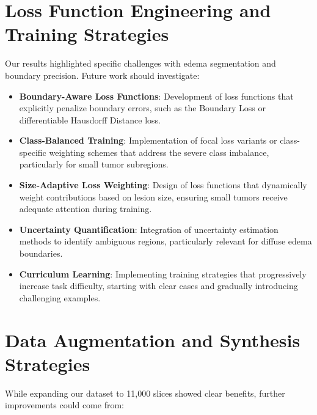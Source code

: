 \section{Loss Function Engineering and Training Strategies}

Our results highlighted specific challenges with edema segmentation and boundary precision. Future work should investigate:

\begin{itemize}
    \item \textbf{Boundary-Aware Loss Functions}: Development of loss functions that explicitly penalize boundary errors, such as the Boundary Loss or differentiable Hausdorff Distance loss.
    
    \item \textbf{Class-Balanced Training}: Implementation of focal loss variants or class-specific weighting schemes that address the severe class imbalance, particularly for small tumor subregions.
    
    \item \textbf{Size-Adaptive Loss Weighting}: Design of loss functions that dynamically weight contributions based on lesion size, ensuring small tumors receive adequate attention during training.
    
    \item \textbf{Uncertainty Quantification}: Integration of uncertainty estimation methods to identify ambiguous regions, particularly relevant for diffuse edema boundaries.
    
    \item \textbf{Curriculum Learning}: Implementing training strategies that progressively increase task difficulty, starting with clear cases and gradually introducing challenging examples.
\end{itemize}

\section{Data Augmentation and Synthesis Strategies}

While expanding our dataset to 11,000 slices showed clear benefits, further improvements could come from:

